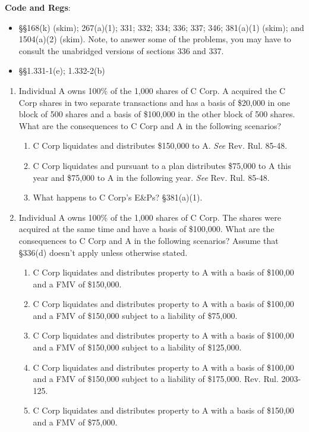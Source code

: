 \documentclass[12pt]{article}
\begin{document}
	\textbf{Code and Regs}: 
		\begin{itemize}
				\item
					\S\S 168(k) (skim); 267(a)(1); 331; 332; 334; 336; 337; 346; 381(a)(1) (skim); and 1504(a)(2) (skim).	Note, to answer some of the problems, you may have to consult the unabridged versions of sections 336 and 337.
					
				\item
					\S\S  1.331-1(e); 1.332-2(b)
					\\
		\end{itemize}

	

\begin{enumerate}

		
	
	\item 
		Individual A owns 100\% of the 1,000 shares of C Corp.  A acquired the C Corp shares in two separate transactions and has a basis of \$20,000 in one block of 500 shares and a basis of \$100,000  in the other block of 500 shares.   What are the consequences to C Corp and A in the following scenarios?    
		\begin{enumerate}
			\item C Corp liquidates and distributes \$150,000 to A. \textit{See} Rev. Rul. 85-48.
			\item C Corp liquidates and pursuant to a plan distributes \$75,000 to A this year and \$75,000 to A in the following year.  \textit{See} Rev. Rul. 85-48.
			\item  What happens to C Corp's E\&Ps? \S381(a)(1).
		\end{enumerate}

	\item 
		Individual A owns 100\% of the 1,000 shares of C Corp.  The shares were acquired at the same time and have a basis of \$100,000.  What are the consequences to C Corp and A in the following scenarios?   Assume that \S336(d) doesn't apply unless otherwise stated.   
		
		\begin{enumerate}	
			\item C Corp liquidates and distributes property to A with a basis of \$100,00 and a FMV of \$150,000.  
			\item C Corp liquidates and distributes property to A with a basis of \$100,00 and a FMV of \$150,000 subject to a liability of \$75,000.
			\item C Corp liquidates and distributes property to A with a basis of \$100,00 and a FMV of \$150,000 subject to a liability of \$125,000.
			\item C Corp liquidates and distributes property to A with a basis of \$100,00 and a FMV of \$150,000 subject to a liability of \$175,000.  Rev. Rul. 2003-125.
			\item  C Corp liquidates and distributes property to A with a basis of \$150,00 and a FMV of \$75,000. 
		\end{enumerate}
		

\end{enumerate}
\end{document}
